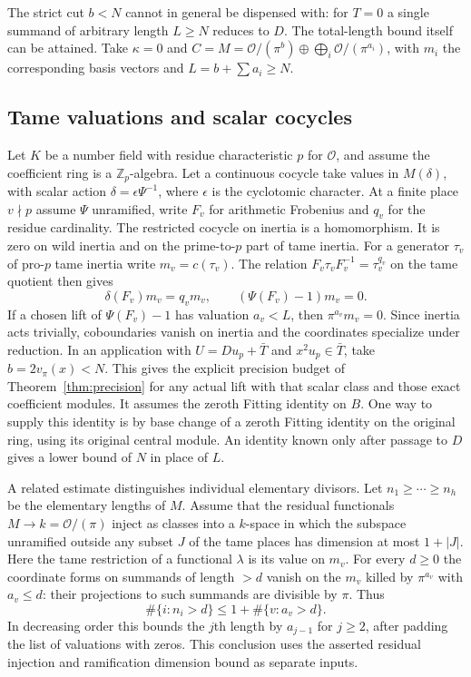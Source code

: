 \documentclass[11pt]{article}
\newcommand{\OO}{\mathcal O}
\begin{document}
The strict cut $b<N$ cannot in general be dispensed with: for $T=0$
a single summand of arbitrary length $L\ge N$ reduces to $D$. The
total-length bound itself can be attained. Take $\kappa=0$ and
$C=M=\OO/(\pi^b)\oplus\bigoplus_i\OO/(\pi^{a_i})$,
with $m_i$ the corresponding basis vectors and $L=b+\sum a_i\ge N$.

\subsection{Tame valuations and scalar cocycles}
Let $K$ be a number field with residue characteristic $p$ for $\OO$,
and assume the coefficient ring is a $\mathbb Z_p$-algebra. Let a
continuous cocycle take values in $M(\delta)$, with scalar action
$\delta=\epsilon\Psi^{-1}$, where $\epsilon$ is the cyclotomic
character. At a finite place $v\nmid p$ assume $\Psi$ unramified,
write $F_v$ for arithmetic Frobenius and $q_v$ for the residue
cardinality. The restricted cocycle on inertia is a homomorphism.
It is zero on wild inertia and on the prime-to-$p$ part of tame inertia.
For a generator $\tau_v$ of pro-$p$ tame inertia write $m_v=c(\tau_v)$.
The relation $F_v\tau_vF_v^{-1}=\tau_v^{q_v}$ on the tame quotient
then gives
\[
 \delta(F_v)m_v=q_vm_v,\qquad (\Psi(F_v)-1)m_v=0.
\]
If a chosen lift of $\Psi(F_v)-1$ has valuation $a_v<L$, then
$\pi^{a_v}m_v=0$. Since inertia acts trivially, coboundaries vanish
on inertia and the coordinates specialize under reduction. In an
application with $U=D u_p+\bar T$ and $x^2u_p\in\bar T$, take
$b=2v_\pi(x)<N$. This gives the explicit precision budget of
Theorem~\ref{thm:precision} for any actual lift with that scalar class
and those exact coefficient modules. It assumes the zeroth Fitting
identity on $B$. One way to supply this identity is by base change
of a zeroth Fitting identity on the original ring, using its original
central module. An identity known only after passage to $D$ gives a
lower bound of $N$ in place of $L$.

A related estimate distinguishes individual elementary divisors.
Let $n_1\ge\cdots\ge n_h$ be the elementary lengths of $M$.
Assume that the residual functionals $M\to k=\OO/(\pi)$ inject
as classes into a $k$-space in which the subspace unramified outside
any subset $J$ of the tame places has dimension at most $1+|J|$.
Here the tame restriction of a functional $\lambda$ is its value on
$m_v$. For every $d\ge0$ the coordinate forms on summands of length
$>d$ vanish on the $m_v$ killed by $\pi^{a_v}$ with $a_v\le d$:
their projections to such summands are divisible by $\pi$. Thus
\[
 \#\{i:n_i>d\}\le 1+\#\{v:a_v>d\}.
\]
In decreasing order this bounds the $j$th length by $a_{j-1}$ for
$j\ge2$, after padding the list of valuations with zeros. This
conclusion uses the asserted residual injection and ramification
dimension bound as separate inputs.
\end{document}
